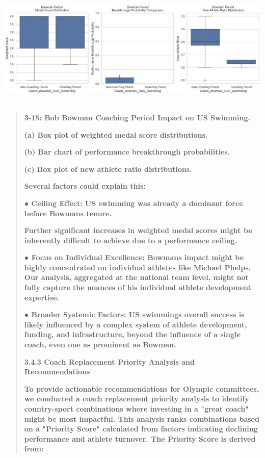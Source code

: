 \documentclass[12pt,a4paper]{article}
\renewenvironment{quote}{\begin{quotation}}{\end{quotation}}  %
\begin{document}
    \includegraphics[width=6.29833in,height=2.20167in]{./media/media/image24.jpeg}
    
    \begin{quote}
    \textbf{3-15: Bob Bowman Coaching Period Impact on US Swimming.}
    
    \textbf{(a) Box plot of weighted medal score distributions.}
    
    \textbf{(b) Bar chart of performance breakthrough probabilities.}
    
    \textbf{(c) Box plot of new athlete ratio distributions.}
    
    \textbf{Several factors could explain this:}
    
    \textbf{● Ceiling Effect: US swimming was already a dominant force
    before Bowman\textquotesingle s tenure.}
    
    \textbf{Further significant increases in weighted medal scores might be
    inherently difficult to achieve due to a performance ceiling.}
    
    \textbf{● Focus on Individual Excellence: Bowman\textquotesingle s
    impact might be highly concentrated on individual athletes like Michael
    Phelps. Our analysis, aggregated at the national team level, might not
    fully capture the nuances of his individual athlete development
    expertise.}
    
    \textbf{● Broader Systemic Factors: US swimming\textquotesingle s
    overall success is likely influenced by a complex system of athlete
    development, funding, and infrastructure, beyond the influence of a
    single coach, even one as prominent as Bowman.}
    
    \protect{}\label{bookmark21-1}{}\textbf{3.4.3 Coach
    Replacement Priority Analysis and Recommendations}
    
    \textbf{To provide actionable recommendations for Olympic committees, we
    conducted a coach replacement priority analysis to identify
    country-sport combinations where investing in a "great coach" might be
    most impactful. This analysis ranks combinations based on a "Priority
    Score" calculated from factors indicating declining performance and
    athlete turnover. The Priority Score is derived from:}
    

\end{quote}
\end{document}
